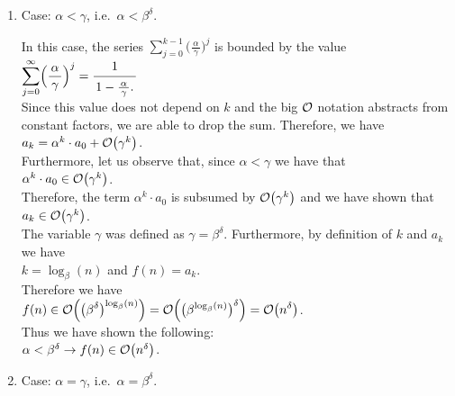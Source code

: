 \begin{enumerate}
\item Case: $\alpha < \gamma$, i.e.~$\alpha < \beta^\delta$.

      In this case, the series $\sum\limits_{j=0}^{k-1} \bigl(\frac{\,\alpha\,}{\gamma}\bigr)^j$ is bounded 
      by the value
      \\[0.2cm]
      \hspace*{1.3cm}
      $\displaystyle \sum\limits_{j=0}^{\infty} \Bigl(\frac{\,\alpha\,}{\gamma}\Bigr)^j = \bruch{1}{1 - \frac{\,\alpha\,}{\gamma}.}$
      \\[0.2cm]
      Since this value does not depend on $k$ and the big $\mathcal{O}$ notation abstracts from constant factors,
      we are able to drop the sum.  Therefore, we have
      \\[0.2cm]
      \hspace*{1.3cm}
      $a_k = \alpha^k \cdot a_0 + \mathcal{O}\bigl(\gamma^k\bigr)$.
      \\[0.2cm] 
      Furthermore, let us observe that, since $\alpha < \gamma$ we have that 
      \\[0.2cm]
      \hspace*{1.3cm}
      $\alpha^k \cdot a_0 \in \mathcal{O}\bigl(\gamma^k\bigr)$.
      \\[0.2cm]
      Therefore, the term $\alpha^k \cdot a_0$ is subsumed by $\mathcal{O}\bigl(\gamma^k\bigr)$ and we have shown that
      \\[0.2cm]
      \hspace*{1.3cm}
      $a_k \in \mathcal{O}\bigl(\gamma^k\bigr)$.
      \\[0.2cm]
      The variable $\gamma$ was defined as $\gamma = \beta^\delta$.  Furthermore, by definition of $k$ and $a_k$
      we have 
      \\[0.2cm]
      \hspace*{1.3cm}
      $k = \log_{\beta}(n)$ \quad and \quad $f(n) = a_k$.  
      \\[0.2cm]
      Therefore we have 
      \\[0.2cm]
      \hspace*{1.3cm}
      $\displaystyle f(n) \in \mathcal{O}\Bigl(\bigl(\beta^\delta\bigr)^{\log_{\beta}(n)}\Bigr) = \mathcal{O}\Bigl(\bigl(\beta^{\log_{\beta}(n)}\bigr)^\delta\Bigr) = \mathcal{O}\bigl(n^\delta\bigr)$.
      \\[0.2cm] 
      Thus we have shown the following:
      \\[0.2cm]
      \hspace*{1.3cm}
      $\alpha < \beta^\delta \rightarrow f(n) \in \mathcal{O}\bigl(n^\delta\bigr)$.
\item Case: $\alpha = \gamma$, i.e.~$\alpha = \beta^\delta$.


\end{enumerate}

